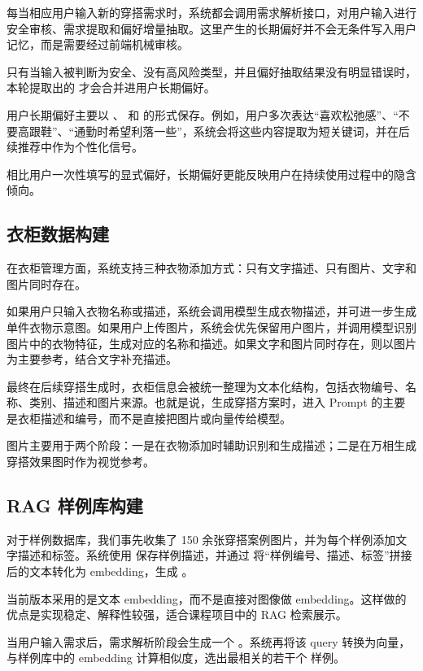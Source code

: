 \documentclass{applemlr}
\begin{document}
每当相应用户输入新的穿搭需求时，系统都会调用需求解析接口，对用户输入进行安全审核、需求提取和偏好增量抽取。这里产生的长期偏好并不会无条件写入用户记忆，而是需要经过前端机械审核。

只有当输入被判断为安全、没有高风险类型，并且偏好抽取结果没有明显错误时，本轮提取出的  才会合并进用户长期偏好。

用户长期偏好主要以 、 和  的形式保存。例如，用户多次表达``喜欢松弛感''、``不要高跟鞋''、``通勤时希望利落一些''，系统会将这些内容提取为短关键词，并在后续推荐中作为个性化信号。

相比用户一次性填写的显式偏好，长期偏好更能反映用户在持续使用过程中的隐含倾向。

\subsection{衣柜数据构建}

在衣柜管理方面，系统支持三种衣物添加方式：只有文字描述、只有图片、文字和图片同时存在。

如果用户只输入衣物名称或描述，系统会调用模型生成衣物描述，并可进一步生成单件衣物示意图。如果用户上传图片，系统会优先保留用户图片，并调用模型识别图片中的衣物特征，生成对应的名称和描述。如果文字和图片同时存在，则以图片为主要参考，结合文字补充描述。

最终在后续穿搭生成时，衣柜信息会被统一整理为文本化结构，包括衣物编号、名称、类别、描述和图片来源。也就是说，生成穿搭方案时，进入 Prompt 的主要是衣柜描述和编号，而不是直接把图片或向量传给模型。

图片主要用于两个阶段：一是在衣物添加时辅助识别和生成描述；二是在万相生成穿搭效果图时作为视觉参考。

\subsection{RAG 样例库构建}

对于样例数据库，我们事先收集了 150 余张穿搭案例图片，并为每个样例添加文字描述和标签。系统使用  保存样例描述，并通过  将``样例编号、描述、标签''拼接后的文本转化为 embedding，生成 。

当前版本采用的是文本 embedding，而不是直接对图像做 embedding。这样做的优点是实现稳定、解释性较强，适合课程项目中的 RAG 检索展示。

当用户输入需求后，需求解析阶段会生成一个 。系统再将该 query 转换为向量，与样例库中的 embedding 计算相似度，选出最相关的若干个  样例。
\end{document}
